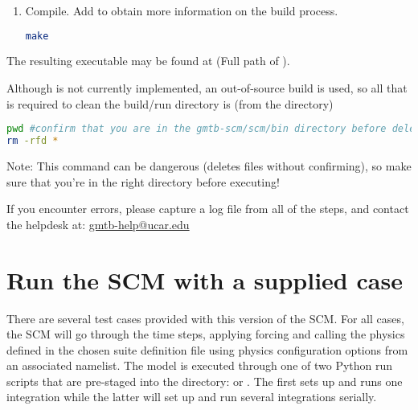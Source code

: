 \begin{enumerate}
If necessary, the CCPP prebuild script can be executed manually from the top level directory (). The basic syntax is
\begin{lstlisting}[language=bash]
./ccpp/framework/scripts/ccpp_prebuild.py --config=./ccpp/config/ccpp_prebuild_config.py --static --suites=SCM_GFS_v15p2,SCM_GFS_v16beta,SCM_GSD_v1[...] --builddir=./scm/bin [--debug]
\end{lstlisting}
where the argument supplied via the  variable is a comma-separated list of suite names that exist in the  directory. Note that suite names are the suite definition filenames minus the  prefix and  suffix.

\item Compile. Add  to obtain more information on the build process.
\begin{lstlisting}[language=bash]
make
\end{lstlisting}
\end{enumerate}

The resulting executable may be found at  (Full path of ).

Although  is not currently implemented, an out-of-source build is used, so all that is required to clean the build/run directory is (from the  directory)
\begin{lstlisting}[language=bash]
pwd #confirm that you are in the gmtb-scm/scm/bin directory before deleting files
rm -rfd *
\end{lstlisting}
Note: This command can be dangerous (deletes files without confirming), so make sure that you're in the right directory before executing!

If you encounter errors, please capture a log file from all of the steps, and contact the helpdesk at: \url{gmtb-help@ucar.edu}

\section{Run the SCM with a supplied case}
There are several test cases provided with this version of the SCM. For all cases, the SCM will go through the time steps, applying forcing and calling the physics defined in the chosen suite definition file using physics configuration options from an associated namelist. The model is executed through one of two Python run scripts that are pre-staged into the  directory:  or . The first sets up and runs one integration while the latter will set up and run several integrations serially. 

